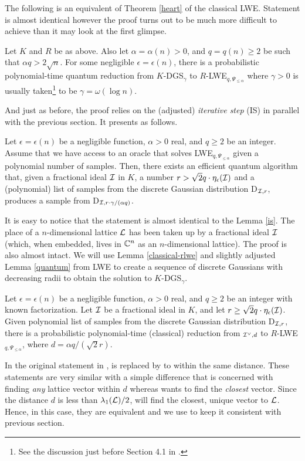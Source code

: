 The following is an equivalent of Theorem \ref{heart} of the classical LWE. Statement is almost identical however the proof turns out to be much more difficult to achieve than it may look at the first glimpse.
\begin{theorem}
	Let $K$ and $R$ be as above. Also let $\alpha = \alpha(n) > 0$, and $q = q(n) \geq 2$ be such that $\alpha q > 2 \sqrt{n}$. For some negligible $\epsilon = \epsilon(n)$, there is a probabilistic polynomial-time quantum reduction from $K$-DGS$_{\gamma}$ to $R$-LWE$_{q,\Psi_{\leq \alpha}}$ where $\gamma > 0$ is usually taken\footnote{See the discussion just before Section 4.1 in \cite{ring-lwe}.} to be $\gamma = \omega(\log n)$.
\end{theorem}
And just as before, the proof relies on the (adjusted) \textit{iterative step} (IS) in parallel with the previous section. It presents as follows.
\begin{lemma}
Let $\epsilon = \epsilon(n)$ be a negligible function, $\alpha > 0$ real, and $q \geq 2$ be an integer. Assume that we have access to an oracle that solves LWE$_{q, \Psi_{\leq \alpha}}$ given a polynomial number of samples. Then, there exists an efficient quantum algorithm that, given a fractional ideal $\mathcal{I}$ in $K$, a number $r > \sqrt{2}q \cdot \eta_{\epsilon}(\mathcal{I})$ and a (polynomial) list of samples from the discrete Gaussian distribution D$_{\mathcal{I},r}$, produces a sample from D$_{\mathcal{I},r \cdot \gamma/(\alpha q)}$.	
\end{lemma}
It is easy to notice that the statement is almost identical to the Lemma \ref{is}. The place of a $n$-dimensional lattice $\mathcal{L}$ has been taken up by a fractional ideal $\mathcal{I}$ (which, when embedded, lives in $\mathbb{C}^n$ as an $n$-dimensional lattice). The proof is also almost intact. We will use Lemma \ref{classical-rlwe} and slightly adjusted Lemma \ref{quantum} from LWE to create a sequence of discrete Gaussians with decreasing radii to obtain the solution to $K$-DGS$_{\gamma}$.
\begin{lemma}\label{classical-rlwe}
	Let $\epsilon = \epsilon(n)$ be a negligible function, $\alpha > 0$ real, and $q \geq 2$ be an integer with known factorization. Let $\mathcal{I}$ be a fractional ideal in $K$, and let $r \geq \sqrt{2}q \cdot \eta_{\epsilon}(\mathcal{I})$. Given polynomial list of samples from the discrete Gaussian distribution D$_{\mathcal{I},r}$, there is a probabilistic polynomial-time (classical) reduction from $_{\mathcal{I}^{\vee},d}$ to $R$-LWE$_{q,\Psi_{\leq \alpha}}$, where $d = \alpha q/(\sqrt{2}r)$.
\end{lemma}
\begin{remark}
	In the original statement in \cite{ring-lwe},  is replaced by  to within the same distance. These statements are very similar with a simple difference that  is concerned with finding \textit{any} lattice vector within $d$ whereas  wants to find the \textit{closest} vector. Since the distance $d$ is less than $\lambda_1(\mathcal{L})/2$,  will find the closest, unique vector to $\mathcal{L}$. Hence, in this case, they are equivalent and we use  to keep it consistent with previous section.
\end{remark}

